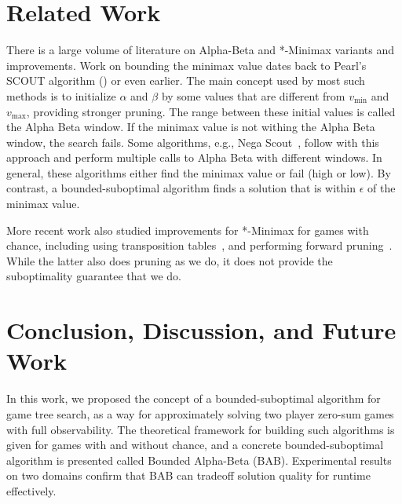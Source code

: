 \documentclass[runningheads]{llncs}
\newcommand{\vmax}{v_{\text{max}}}
\newcommand{\vmin}{v_{\text{min}}}
\begin{document}
\section{Related Work}

There is a large volume of literature on Alpha-Beta and *-Minimax variants and improvements. 
Work on bounding the minimax value dates back to Pearl's SCOUT algorithm (\citeyear{pearl1980scout}) or even earlier. The main concept used by most such methods is to initialize $\alpha$ and $\beta$ by some values that are different from $\vmin$ and $\vmax$, providing stronger pruning. 
The range between these initial values is called the Alpha Beta window. If the minimax value is not withing the Alpha Beta window, the search fails. Some algorithms, e.g., Nega Scout~\citep{reinefeld1983improvement}, follow with this approach and perform multiple calls to Alpha Beta with different windows. 
In general, these algorithms either find the minimax value or fail (high or low). By contrast, a bounded-suboptimal algorithm finds a solution that is within $\epsilon$ of the minimax value. %

More recent work also studied improvements for *-Minimax for games with chance, including using transposition tables~\citep{veness2007effective}, and performing forward pruning~\citep{schadd2009chanceprobcut}. While the latter also does pruning as we do, it does not provide the suboptimality guarantee that we do. 

\section{Conclusion, Discussion, and Future Work}
In this work, we proposed the concept of a bounded-suboptimal algorithm for game tree search, as a way for approximately solving two player zero-sum games with full observability. The theoretical framework for building such algorithms is given for games with and without chance, and a concrete bounded-suboptimal algorithm is presented called Bounded Alpha-Beta (BAB). Experimental results on two domains confirm that BAB can tradeoff solution quality for runtime effectively. 
\end{document}
